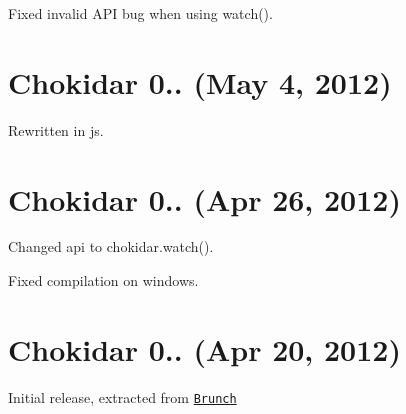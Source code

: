 \begin{DoxyItemize}
\item Fixed invalid A\+PI bug when using {\ttfamily watch()}.
\end{DoxyItemize}

\section*{Chokidar 0.. (May 4, 2012)}


\begin{DoxyItemize}
\item Rewritten in js.
\end{DoxyItemize}

\section*{Chokidar 0.. (Apr 26, 2012)}


\begin{DoxyItemize}
\item Changed api to {\ttfamily chokidar.\+watch()}.
\item Fixed compilation on windows.
\end{DoxyItemize}

\section*{Chokidar 0.. (Apr 20, 2012)}


\begin{DoxyItemize}
\item Initial release, extracted from \href{https://github.com/brunch/brunch/blob/9847a065aea300da99bd0753f90354cde9de1261/src/helpers.coffee#L66}{\tt Brunch} 
\end{DoxyItemize}